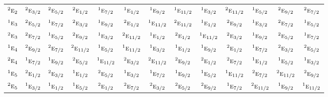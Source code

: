\documentclass[10pt,a4paper]{article}
\numberwithin{equation}{section}
\newcommand{\irr}[1]{\text{\normalfont\scshape #1}}
\newcommand{\conjpair}[1]{{}^{#1}}
\begin{document}
{\begin{longtable}{@{}lcccccccccccc@{}}
$\conjpair{2}\irr{e}_{2}$ & $\conjpair{2}\irr{e}_{3/2}$ & $\conjpair{2}\irr{e}_{5/2}$ & $\conjpair{2}\irr{e}_{1/2}$ & $\conjpair{1}\irr{e}_{7/2}$ & $\conjpair{1}\irr{e}_{1/2}$ & $\conjpair{1}\irr{e}_{9/2}$ & $\conjpair{1}\irr{e}_{11/2}$ & $\conjpair{1}\irr{e}_{3/2}$ & $\conjpair{2}\irr{e}_{11/2}$ & $\conjpair{1}\irr{e}_{5/2}$ & $\conjpair{2}\irr{e}_{9/2}$ & $\conjpair{2}\irr{e}_{7/2}$\\
$\conjpair{1}\irr{e}_{3}$ & $\conjpair{2}\irr{e}_{5/2}$ & $\conjpair{1}\irr{e}_{7/2}$ & $\conjpair{2}\irr{e}_{3/2}$ & $\conjpair{1}\irr{e}_{9/2}$ & $\conjpair{2}\irr{e}_{1/2}$ & $\conjpair{1}\irr{e}_{11/2}$ & $\conjpair{2}\irr{e}_{11/2}$ & $\conjpair{1}\irr{e}_{1/2}$ & $\conjpair{2}\irr{e}_{9/2}$ & $\conjpair{1}\irr{e}_{3/2}$ & $\conjpair{2}\irr{e}_{7/2}$ & $\conjpair{1}\irr{e}_{5/2}$\\
$\conjpair{2}\irr{e}_{3}$ & $\conjpair{2}\irr{e}_{7/2}$ & $\conjpair{1}\irr{e}_{5/2}$ & $\conjpair{2}\irr{e}_{9/2}$ & $\conjpair{1}\irr{e}_{3/2}$ & $\conjpair{2}\irr{e}_{11/2}$ & $\conjpair{1}\irr{e}_{1/2}$ & $\conjpair{2}\irr{e}_{1/2}$ & $\conjpair{1}\irr{e}_{11/2}$ & $\conjpair{2}\irr{e}_{3/2}$ & $\conjpair{1}\irr{e}_{9/2}$ & $\conjpair{2}\irr{e}_{5/2}$ & $\conjpair{1}\irr{e}_{7/2}$\\
$\conjpair{1}\irr{e}_{4}$ & $\conjpair{2}\irr{e}_{9/2}$ & $\conjpair{2}\irr{e}_{7/2}$ & $\conjpair{2}\irr{e}_{11/2}$ & $\conjpair{1}\irr{e}_{5/2}$ & $\conjpair{1}\irr{e}_{11/2}$ & $\conjpair{1}\irr{e}_{3/2}$ & $\conjpair{1}\irr{e}_{1/2}$ & $\conjpair{1}\irr{e}_{9/2}$ & $\conjpair{2}\irr{e}_{1/2}$ & $\conjpair{1}\irr{e}_{7/2}$ & $\conjpair{2}\irr{e}_{3/2}$ & $\conjpair{2}\irr{e}_{5/2}$\\
$\conjpair{2}\irr{e}_{4}$ & $\conjpair{1}\irr{e}_{7/2}$ & $\conjpair{1}\irr{e}_{9/2}$ & $\conjpair{2}\irr{e}_{5/2}$ & $\conjpair{1}\irr{e}_{11/2}$ & $\conjpair{2}\irr{e}_{3/2}$ & $\conjpair{2}\irr{e}_{11/2}$ & $\conjpair{2}\irr{e}_{9/2}$ & $\conjpair{2}\irr{e}_{1/2}$ & $\conjpair{2}\irr{e}_{7/2}$ & $\conjpair{1}\irr{e}_{1/2}$ & $\conjpair{1}\irr{e}_{5/2}$ & $\conjpair{1}\irr{e}_{3/2}$\\
$\conjpair{1}\irr{e}_{5}$ & $\conjpair{2}\irr{e}_{1/2}$ & $\conjpair{2}\irr{e}_{3/2}$ & $\conjpair{1}\irr{e}_{1/2}$ & $\conjpair{2}\irr{e}_{5/2}$ & $\conjpair{1}\irr{e}_{3/2}$ & $\conjpair{1}\irr{e}_{7/2}$ & $\conjpair{1}\irr{e}_{9/2}$ & $\conjpair{1}\irr{e}_{5/2}$ & $\conjpair{1}\irr{e}_{11/2}$ & $\conjpair{2}\irr{e}_{7/2}$ & $\conjpair{2}\irr{e}_{11/2}$ & $\conjpair{2}\irr{e}_{9/2}$\\
$\conjpair{2}\irr{e}_{5}$ & $\conjpair{1}\irr{e}_{3/2}$ & $\conjpair{1}\irr{e}_{1/2}$ & $\conjpair{1}\irr{e}_{5/2}$ & $\conjpair{2}\irr{e}_{1/2}$ & $\conjpair{2}\irr{e}_{7/2}$ & $\conjpair{2}\irr{e}_{3/2}$ & $\conjpair{2}\irr{e}_{5/2}$ & $\conjpair{2}\irr{e}_{9/2}$ & $\conjpair{1}\irr{e}_{7/2}$ & $\conjpair{2}\irr{e}_{11/2}$ & $\conjpair{1}\irr{e}_{9/2}$ & $\conjpair{1}\irr{e}_{11/2}$\\

\end{longtable}}
\end{document}
